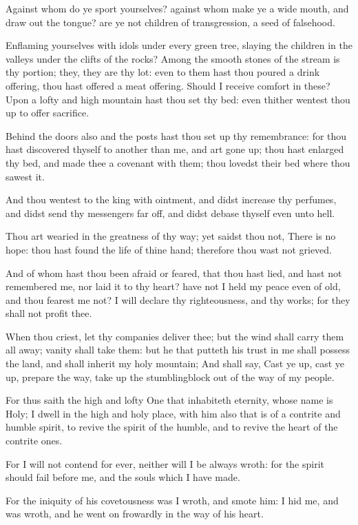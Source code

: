 \verse Against whom do ye sport yourselves? against whom make ye a wide mouth, and draw out the tongue? are ye not children of transgression, a seed of falsehood.

\verse Enflaming yourselves with idols under every green tree, slaying the children in the valleys under the clifts of the rocks?  \verse Among the smooth stones of the stream is thy portion; they, they are thy lot: even to them hast thou poured a drink offering, thou hast offered a meat offering. Should I receive comfort in these?  \verse Upon a lofty and high mountain hast thou set thy bed: even thither wentest thou up to offer sacrifice.

\verse Behind the doors also and the posts hast thou set up thy remembrance: for thou hast discovered thyself to another than me, and art gone up; thou hast enlarged thy bed, and made thee a covenant with them; thou lovedst their bed where thou sawest it.

\verse And thou wentest to the king with ointment, and didst increase thy perfumes, and didst send thy messengers far off, and didst debase thyself even unto hell.

\verse Thou art wearied in the greatness of thy way; yet saidst thou not, There is no hope: thou hast found the life of thine hand; therefore thou wast not grieved.

\verse And of whom hast thou been afraid or feared, that thou hast lied, and hast not remembered me, nor laid it to thy heart? have not I held my peace even of old, and thou fearest me not?  \verse I will declare thy righteousness, and thy works; for they shall not profit thee.

\verse When thou criest, let thy companies deliver thee; but the wind shall carry them all away; vanity shall take them: but he that putteth his trust in me shall possess the land, and shall inherit my holy mountain; \verse And shall say, Cast ye up, cast ye up, prepare the way, take up the stumblingblock out of the way of my people.

\verse For thus saith the high and lofty One that inhabiteth eternity, whose name is Holy; I dwell in the high and holy place, with him also that is of a contrite and humble spirit, to revive the spirit of the humble, and to revive the heart of the contrite ones.

\verse For I will not contend for ever, neither will I be always wroth: for the spirit should fail before me, and the souls which I have made.

\verse For the iniquity of his covetousness was I wroth, and smote him: I hid me, and was wroth, and he went on frowardly in the way of his heart.

